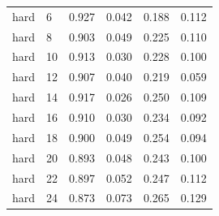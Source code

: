 \begin{tabular}{llcccc}
hard & 6 & 0.927 & 0.042 & 0.188 & 0.112 \\
hard & 8 & 0.903 & 0.049 & 0.225 & 0.110 \\
hard & 10 & 0.913 & 0.030 & 0.228 & 0.100 \\
hard & 12 & 0.907 & 0.040 & 0.219 & 0.059 \\
hard & 14 & 0.917 & 0.026 & 0.250 & 0.109 \\
hard & 16 & 0.910 & 0.030 & 0.234 & 0.092 \\
hard & 18 & 0.900 & 0.049 & 0.254 & 0.094 \\
hard & 20 & 0.893 & 0.048 & 0.243 & 0.100 \\
hard & 22 & 0.897 & 0.052 & 0.247 & 0.112 \\
hard & 24 & 0.873 & 0.073 & 0.265 & 0.129 \\
\bottomrule
\end{tabular}